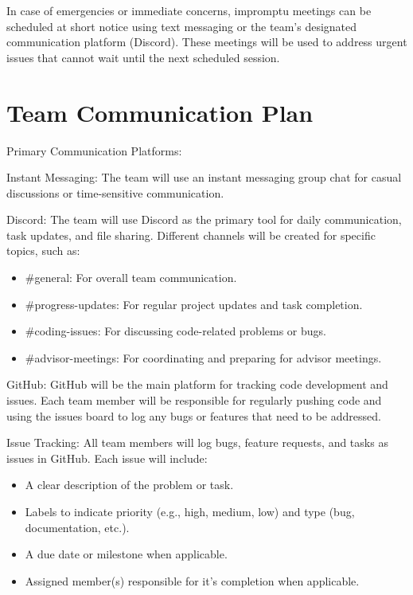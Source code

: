\documentclass{article}
\begin{document}
In case of emergencies or immediate concerns, impromptu meetings can be scheduled at short notice using text messaging or the team’s designated communication platform (Discord). These meetings will be used to address urgent issues that cannot wait until the next scheduled session.
\section{Team Communication Plan}

Primary Communication Platforms:\par

\begin{flushleft}
  Instant Messaging: The team will use an instant messaging group chat for casual discussions or time-sensitive communication.\par

  Discord: The team will use Discord as the primary tool for daily communication, task updates, and file sharing. Different channels will be created for specific topics, such as:
\end{flushleft}

\begin{itemize}
    \item \#general: For overall team communication.
    \item \#progress-updates: For regular project updates and task completion.
    \item \#coding-issues: For discussing code-related problems or bugs.
    \item \#advisor-meetings: For coordinating and preparing for advisor meetings.
\end{itemize}

\begin{flushleft}
  GitHub: GitHub will be the main platform for tracking code development and issues. Each team member will be responsible for regularly pushing code and using the issues board to log any bugs or features that need to be addressed.\par

  Issue Tracking: All team members will log bugs, feature requests, and tasks as issues in GitHub. Each issue will include:
\end{flushleft}

\begin{itemize}
    \item A clear description of the problem or task.
    \item Labels to indicate priority (e.g., high, medium, low) and type (bug, documentation, etc.).
    \item A due date or milestone when applicable.
    \item Assigned member(s) responsible for it's completion when applicable.
\end{itemize}
\end{document}
